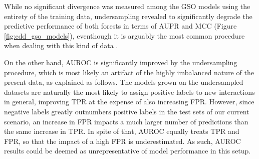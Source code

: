While no significant divergence was measured among the GSO models using the entirety of the training data, undersampling revealed to significantly degrade the predictive performance of both forests in terms of AUPR and MCC (Figure \ref{fig:cdd_gso_models}), eventhough it is arguably the most common procedure when dealing with this kind of data \cite{}.

On the other hand, AUROC is significantly improved by the undersampling procedure, which is most likely an artifact of the highly imbalanced nature of the present data, as explained as follows. The models grown on the undersampled datasets are naturally the most likely to assign positive labels to new interactions in general, improving TPR at the expense of also increasing FPR. However, since negative labels greatly outnumbers positive labels in the test sets of our current scenario, an increase in FPR impacts a much larger number of predictions than the same increase in TPR. In spite of that, AUROC equally treats TPR and FPR, so that the impact of a high FPR is underestimated. As such, AUROC results could be deemed as unrepresentative of model performance in this setup.

